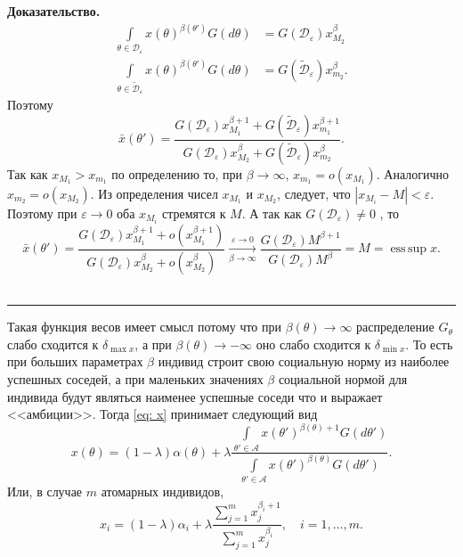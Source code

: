 \documentclass[12pt]{article}
\newenvironment{proof}[1][Доказательство]{\noindent\textbf{#1.} }{\ \rule{0.5em}{0.5em}}
\newcommand\abs[1]{\left\lvert#1\right\rvert}
\DeclareMathOperator*{\esssup}{ess\,sup}
\begin{document}
\begin{proof}
\begin{align*}
\int\limits_{\theta \in \mathcal{D}_\varepsilon}x(\theta)^{\beta(\theta')}G(d \theta) &= G(\mathcal{D}_\varepsilon) x_{M_2}^{\beta}  \\
\int\limits_{\theta \in \widetilde{\mathcal{D}}_\varepsilon}x(\theta)^{\beta(\theta')}G(d \theta) &= G(\widetilde{\mathcal{D}}_\varepsilon) x_{m_2}^{\beta}.
\end{align*}
Поэтому 
\begin{equation*}
\bar{x}(\theta') = \frac{G(\mathcal{D}_\varepsilon) x_{M_1}^{\beta + 1} + G(\widetilde{\mathcal{D}}_\varepsilon) x_{m_1}^{\beta+1}}{G(\mathcal{D}_\varepsilon) x_{M_2}^{\beta} + G(\widetilde{\mathcal{D}}_\varepsilon) x_{m_2}^{\beta}}.
\end{equation*}
Так как $x_{M_1} > x_{m_1}$ по определению то,  при $\beta \to \infty$,  $x_{m_1} = o(x_{M_1}). $ 
Аналогично $x_{m_2} = o(x_{M_2}). $ 
Из определения чисел $x_{M_1}$ и $x_{M_2}$,  следует,  что $\abs{x_{M_i} - M} < \varepsilon$.  Поэтому при $\varepsilon \to 0$ оба $x_{M_i}$ стремятся к $M$. 
А так как $G(\mathcal{D}_\varepsilon) \neq 0$ ,  то
\begin{equation*}
\bar{x}(\theta') = \frac{G(\mathcal{D}_\varepsilon) x_{M_1}^{\beta + 1} + o(x_{M_1}^{\beta+1})}{G(\mathcal{D}_\varepsilon) x_{M_2}^{\beta} + o(x_{M_2}^{\beta})} \xrightarrow[\beta \to \infty]{ \varepsilon \to 0} \frac{G(\mathcal{D}_\varepsilon)M^{\beta+1}}{G(\mathcal{D}_\varepsilon)M^{\beta}} = M = \esssup x.
\end{equation*}
\end{proof}

Такая функция весов имеет смысл потому что при $\beta(\theta) \rightarrow \infty$ распределение $G_\theta$ слабо сходится к $\delta_{\max x}$,  а при $\beta(\theta) \rightarrow -\infty$ оно слабо сходится к $\delta_{\min x}$.  
То есть при больших параметрах $\beta$ индивид строит свою социальную норму из наиболее успешных соседей,  а при маленьких значениях $\beta$ социальной нормой для индивида будут являться наименее успешные соседи что и выражает <<амбиции>>.
Тогда \eqref{eq: x} принимает следующий вид
$$
x(\theta) = (1-\lambda)\alpha(\theta) + \lambda \frac{\int\limits_{\theta' \in \mathcal{A}} x(\theta')^{\beta(\theta) + 1} G(d \theta')}{\int\limits_{\theta' \in \mathcal{A}} x(\theta')^{\beta(\theta)}G(d \theta')}.
$$
Или,  в случае $m$ атомарных индивидов,
$$
x_i = (1-\lambda) \alpha_i + \lambda \frac{\sum\limits_{j=1}^m x_j^{\beta_i+1}}{\sum\limits_{j=1}^m x_j^{\beta_i}}, \quad i = 1,\dots , m.
$$
\end{document}
